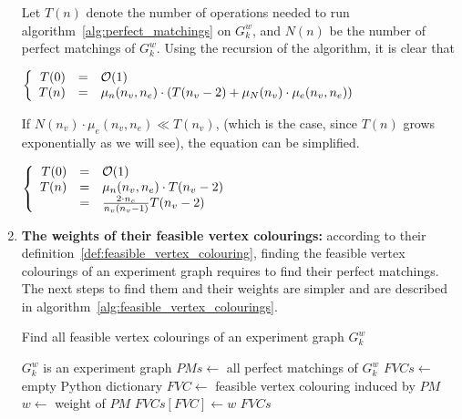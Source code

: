 \begin{enumerate}
        Let $T(n)$ denote the number of operations needed to run algorithm~\ref{alg:perfect_matchings} on $G_k^w$, and $N(n)$ be the number of perfect matchings of $G_k^w$.
        Using the recursion of the algorithm, it is clear that
        \begin{center}
            $\left\{ \begin{array}{r c l}
                T(0) & = & \mathcal{O}(1) \\
                T(n) & = & \mu_n(n_v, n_e) \cdot \left( T(n_v - 2) + \mu_N(n_v) \cdot \mu_e(n_v, n_e) \right)
            \end{array}\right.$
        \end{center}

        If $N(n_v) \cdot \mu_e(n_v, n_e) \ll T(n_v)$, (which is the case, since $T(n)$ grows exponentially as we will see), the equation can be simplified.
        \begin{center}
            $\left\{\begin{array}{r c l}
                        T(0) & = & \mathcal{O}(1)                            \\
                        T(n) & = & \mu_n(n_v, n_e) \cdot T(n_v - 2)          \\
                        & = & \frac{2 \cdot n_e}{n_v(n_v-1)} T(n_v - 2)      \\
            \end{array}\right.$
        \end{center}

    \item \textbf{The weights of their feasible vertex colourings:} according to their definition~\ref{def:feasible_vertex_colouring}, finding the feasible vertex colourings of an experiment graph requires to find their perfect matchings.
        The next steps to find them and their weights are simpler and are described in algorithm~\ref{alg:feasible_vertex_colourings}.

        \begin{algorithm}
            \caption{Find all feasible vertex colourings of an experiment graph $G_k^w$}
            \label{alg:feasible_vertex_colourings}
            \begin{algorithmic}
                \Require $G_k^w$ is an experiment graph
                \State $PMs \gets$ all perfect matchings of $G_k^w$
                \State $FVCs \gets$ empty Python dictionary
                    \State $FVC \gets$ feasible vertex colouring induced by $PM$
                    \State $w \gets$ weight of $PM$
                    \State $FVCs[FVC] \gets w$
                \EndFor
                \State \Return $FVCs$
            \end{algorithmic}
        \end{algorithm}


\end{enumerate}
